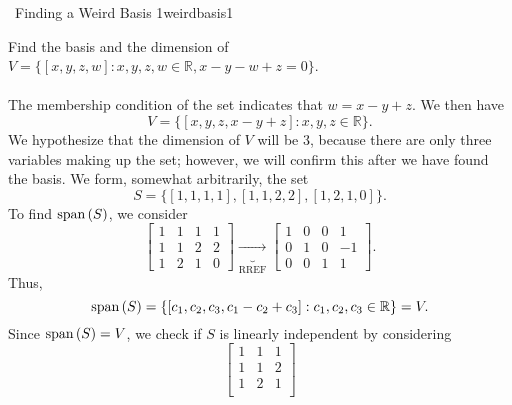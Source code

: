         \begin{example}{\Difficulty\,\Difficulty\,\,Finding a Weird Basis 1}{weirdbasis1}
            
            Find the basis and the dimension of \(V=\{[x,y,z,w]:x,y,z,w\in\mathbb{R}, x-y-w+z=0\}\).
            \\
            \\
            The membership condition of the set indicates that \(w=x-y+z\). We then have
            \begin{equation*}
                V=\{[x,y,z,x-y+z]:x,y,z\in\mathbb{R}\}.
            \end{equation*}
            We hypothesize that the dimension of \(V\) will be \(3\), because there are only three variables making up the set; however, we will confirm this after we have found the basis. We form, somewhat arbitrarily, the set
            \begin{equation*}
                S=\{[1,1,1,1],[1,1,2,2],[1,2,1,0]\}.
            \end{equation*}
            To find \(\text{span\,}(S)\), we consider 
            \begin{equation*}
                \begin{bmatrix}
                    1 & 1 & 1 & 1 \\
                    1 & 1 & 2 & 2 \\
                    1 & 2 & 1 & 0
                \end{bmatrix}\underbrace{\to}_{\text{RREF}}
                \begin{bmatrix}
                    1 & 0 & 0 & 1 \\
                    0 & 1 & 0 & -1 \\
                    0 & 0 & 1 & 1
                \end{bmatrix}.
            \end{equation*}
            Thus,
            \begin{equation*}
                \text{span\,}(S)=\{[c_1,c_2,c_3,c_1-c_2+c_3]:c_1,c_2,c_3\in\mathbb{R}\}=V.
            \end{equation*}
            Since \(\text{span\,}(S)=V\), we check if \(S\) is linearly independent by considering
            \begin{equation*}
                \begin{bmatrix}
                    1 & 1 & 1 \\
                    1 & 1 & 2 \\
                    1 & 2 & 1 \\

\end{bmatrix}
\end{equation*}
\end{example}

